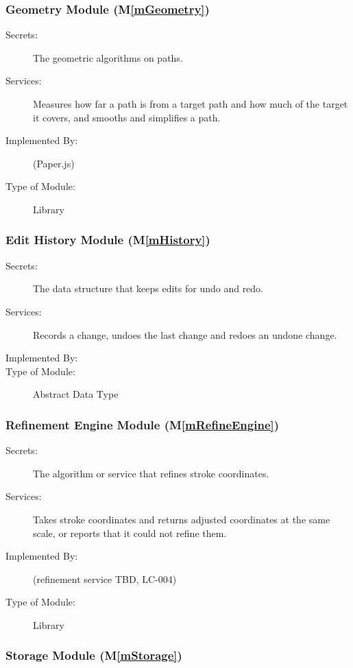 \documentclass[12pt, titlepage]{article}
\newcommand{\mref}[1]{M\ref{#1}}
\begin{document}
\subsubsection{Geometry Module (\mref{mGeometry})}

\begin{description}
\item[Secrets:] The geometric algorithms on paths.
\item[Services:] Measures how far a path is from a target path and how much of
  the target it covers, and smooths and simplifies a path.
\item[Implemented By:] \progname{} (Paper.js)
\item[Type of Module:] Library
\end{description}

\subsubsection{Edit History Module (\mref{mHistory})}

\begin{description}
\item[Secrets:] The data structure that keeps edits for undo and redo.
\item[Services:] Records a change, undoes the last change and redoes an undone
  change.
\item[Implemented By:] \progname{}
\item[Type of Module:] Abstract Data Type
\end{description}

\subsubsection{Refinement Engine Module (\mref{mRefineEngine})}

\begin{description}
\item[Secrets:] The algorithm or service that refines stroke coordinates.
\item[Services:] Takes stroke coordinates and returns adjusted coordinates at
  the same scale, or reports that it could not refine them.
\item[Implemented By:] \progname{} (refinement service TBD, LC-004)
\item[Type of Module:] Library
\end{description}

\subsubsection{Storage Module (\mref{mStorage})}
\end{document}
